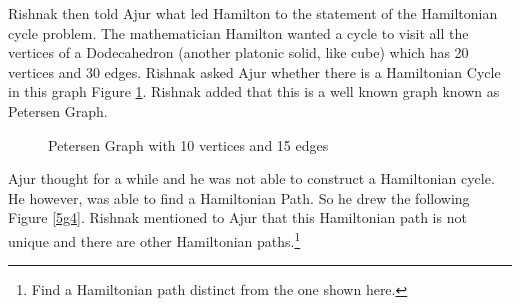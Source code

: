 Rishnak then told Ajur what led Hamilton to the statement of the Hamiltonian cycle problem. The mathematician Hamilton wanted a cycle to visit 
all the vertices of a Dodecahedron (another platonic solid, like cube) which has 20 vertices and 30 edges. 
Rishnak asked Ajur whether there is a Hamiltonian Cycle in this graph Figure \ref{5g3}. Rishnak added that this is a well known graph known as Petersen Graph.

\begin{figure}
\begin{center}
\caption{ Petersen Graph with 10 vertices and 15 edges }\label{5g3}
\end{center}
\end{figure}
Ajur thought for a while and he was not able to construct a Hamiltonian cycle. He however, was able to find a 
Hamiltonian Path. So he drew the following Figure \ref{5g4}. Rishnak mentioned to Ajur that this Hamiltonian path is not unique and there are other Hamiltonian paths.\footnote{Find a Hamiltonian path distinct from the one shown here.}


